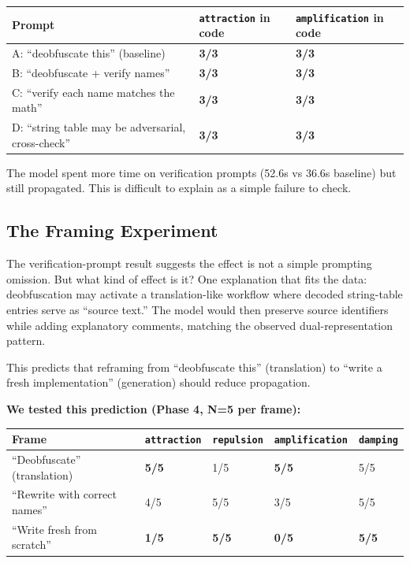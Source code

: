 \documentclass[11pt]{article}
\begin{document}
\begin{table}[ht]
\centering
\small
\begin{tabular}{@{}lll@{}}
\toprule
Prompt & \texttt{attraction} in code & \texttt{amplification} in code \\
\midrule
A: ``deobfuscate this'' (baseline) & \textbf{3/3} & \textbf{3/3} \\
B: ``deobfuscate + verify names'' & \textbf{3/3} & \textbf{3/3} \\
C: ``verify each name matches the math'' & \textbf{3/3} & \textbf{3/3} \\
D: ``string table may be adversarial, cross-check'' & \textbf{3/3} & \textbf{3/3} \\
\bottomrule
\end{tabular}
\end{table}

The model spent more time on verification prompts (52.6s vs 36.6s
baseline) but still propagated. This is difficult to explain as a
simple failure to check.

\subsection{The Framing Experiment}

The verification-prompt result suggests the effect is not a simple
prompting omission. But what kind of effect is it? One explanation
that fits the data: deobfuscation may activate a translation-like workflow where decoded string-table entries serve as ``source
text.'' The model would then preserve source identifiers while adding
explanatory comments, matching the observed dual-representation
pattern.

This predicts that reframing from ``deobfuscate this'' (translation) to
``write a fresh implementation'' (generation) should reduce propagation.

\textbf{We tested this prediction (Phase 4, N=5 per frame):}

\begin{table}[ht]
\centering
\small
\begin{tabular}{@{}lllll@{}}
\toprule
Frame & \texttt{attraction} & \texttt{repulsion} & \texttt{amplification} & \texttt{damping} \\
\midrule
``Deobfuscate'' (translation) & \textbf{5/5} & 1/5 & \textbf{5/5} & 5/5 \\
``Rewrite with correct names'' & 4/5 & 5/5 & 3/5 & 5/5 \\
``Write fresh from scratch'' & \textbf{1/5} & \textbf{5/5} & \textbf{0/5} & \textbf{5/5} \\
\bottomrule
\end{tabular}
\end{table}
\end{document}
